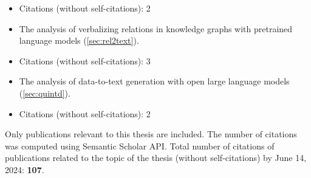 \noindent{}
\begin{itemize}[noitemsep,topsep=0pt]
    \item Citations (without self-citations): 2

\end{itemize}\vspace{.5\baselineskip}


\noindent{}
\begin{itemize}[noitemsep,topsep=0pt]

    \item The analysis of verbalizing relations in knowledge graphs with pretrained language models (\autoref{sec:rel2text}).
    \item Citations (without self-citations): 3

\end{itemize}\vspace{.5\baselineskip}


\noindent{}
\begin{itemize}[noitemsep,topsep=0pt]

    \item The analysis of data-to-text generation with open large language models (\autoref{sec:quintd}).
    \item Citations (without self-citations): 2

\end{itemize}\vspace{.5\baselineskip}

\vfill

\noindent Only publications relevant to this thesis are included. The number of
citations was computed using Semantic Scholar API. Total number of citations of
publications related to the topic of the thesis (without self-citations) by June 14, 2024: {\bf 107}.
